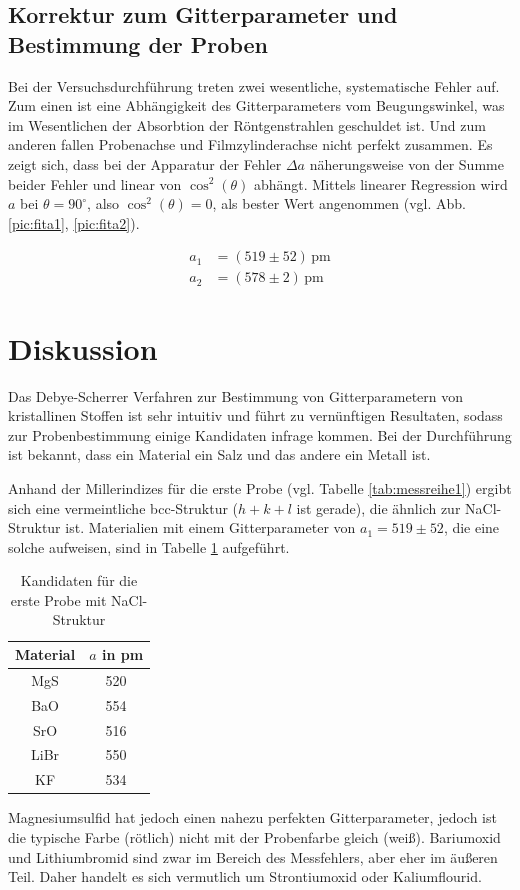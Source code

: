 \subsection{Korrektur zum Gitterparameter und Bestimmung der Proben}
Bei der Versuchsdurchführung treten zwei wesentliche, systematische Fehler auf. Zum einen ist eine Abhängigkeit des Gitterparameters vom Beugungswinkel,
was im Wesentlichen der Absorbtion der Röntgenstrahlen geschuldet ist. Und zum anderen fallen Probenachse und Filmzylinderachse nicht perfekt zusammen.
Es zeigt sich, dass bei der Apparatur der Fehler $\Delta a$ näherungsweise von der Summe beider Fehler und linear von $\cos^2(\theta)$ abhängt. Mittels
linearer Regression wird $a$ bei $\theta = 90^\circ$, also $\cos^2(\theta)=0$, als bester Wert angenommen (vgl. Abb. \ref{pic:fita1}, \ref{pic:fita2}). 

\begin{align}
 a_1 &= (519 \pm 52)\, \text{pm} \\
 \nonumber
 a_2 &= (578 \pm 2)\, \text{pm} 
 \label{eq:latticeResults}
\end{align}

\noindent




\section{Diskussion}
Das Debye-Scherrer Verfahren zur Bestimmung von Gitterparametern von kristallinen Stoffen ist sehr intuitiv und führt zu vernünftigen Resultaten, sodass
zur Probenbestimmung einige Kandidaten infrage kommen. Bei der Durchführung ist bekannt, dass ein Material ein Salz und das andere ein Metall ist. 

\noindent Anhand der Millerindizes für die erste Probe (vgl. Tabelle \ref{tab:messreihe1}) ergibt sich eine vermeintliche bcc-Struktur ($h+k+l$ ist gerade), 
die ähnlich zur NaCl-Struktur ist. Materialien mit einem Gitterparameter von $a_1 = 519 \pm 52$, die eine solche aufweisen, sind in Tabelle \ref{tab:matProb1} 
aufgeführt.

\begin{table}[H]
 \begin{tabular}{cc}
Material &$a$ in pm\\
\hline
MgS& 520\\
BaO & 554\\
SrO & 516\\
LiBr & 550\\
KF & 534
  
 \end{tabular}
 \caption{Kandidaten für die erste Probe mit NaCl-Struktur}
 \label{tab:matProb1}

\end{table}
\noindent Magnesiumsulfid hat jedoch einen nahezu perfekten Gitterparameter, jedoch ist die typische Farbe (rötlich) nicht mit der Probenfarbe gleich (weiß). 
Bariumoxid und Lithiumbromid sind zwar im Bereich des Messfehlers, aber eher im äußeren Teil. Daher handelt es sich vermutlich um Strontiumoxid oder
Kaliumflourid.

